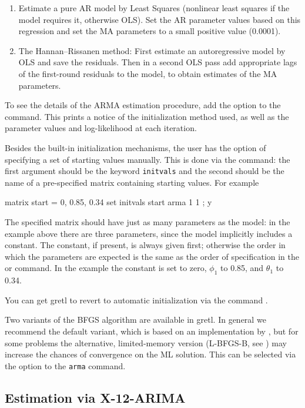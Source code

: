 \begin{enumerate}
\item Estimate a pure AR model by Least Squares (nonlinear least
  squares if the model requires it, otherwise OLS).  Set the AR
  parameter values based on this regression and set the MA
  parameters to a small positive value (0.0001).
\item The Hannan--Rissanen method: First estimate an autoregressive
  model by OLS and save the residuals.  Then in a second OLS pass add
  appropriate lags of the first-round residuals to the model, to
  obtain estimates of the MA parameters.
\end{enumerate}

To see the details of the ARMA estimation procedure, add the
 option to the command.  This prints a notice of the
initialization method used, as well as the parameter values and
log-likelihood at each iteration.

Besides the built-in initialization mechanisms, the user has the
option of specifying a set of starting values manually.  This is done
via the  command: the first argument should be the keyword
\texttt{initvals} and the second should be the name of a pre-specified
matrix containing starting values.  For example
\begin{code}
matrix start = { 0, 0.85, 0.34 }
set initvals start
arma 1 1 ; y
\end{code}
The specified matrix should have just as many parameters as the model:
in the example above there are three parameters, since the model
implicitly includes a constant.  The constant, if present, is always
given first; otherwise the order in which the parameters are
expected is the same as the order of specification in the 
or  command.  In the example the constant is set to zero,
$\phi_1$ to 0.85, and $\theta_1$ to 0.34.

You can get gretl to revert to automatic initialization via
the command .

Two variants of the BFGS algorithm are available in gretl.  In
general we recommend the default variant, which is based on an
implementation by \cite{nash90}, but for some problems the
alternative, limited-memory version (L-BFGS-B, see
\citealp{byrd-etal95}) may increase the chances of convergence on the
ML solution.  This can be selected via the  option to
the \texttt{arma} command.

\subsection{Estimation via X-12-ARIMA}

